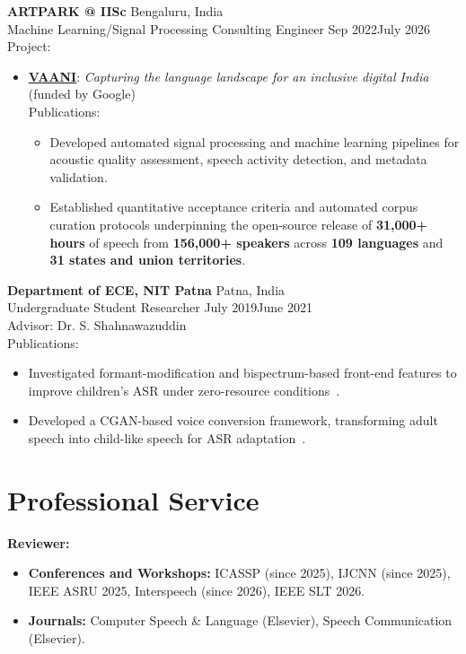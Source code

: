 \documentclass[letterpaper,11pt]{article}
\begin{document}
\textbf{ARTPARK @ IISc} \hfill Bengaluru, India\\
Machine Learning/Signal Processing Consulting Engineer \hfill Sep 2022\textendash July 2026 \\
Project: 
\begin{itemize}
\item \href{https://vaani.iisc.ac.in/}{\textbf{VAANI}}: \textit{Capturing the language landscape for an inclusive digital India} (funded by Google) \\
  Publications: \cite{pulikodan2026vaani}
\begin{itemize}
  \item Developed automated signal processing and machine learning pipelines for acoustic quality assessment, speech activity detection, and metadata validation.
  \item Established quantitative acceptance criteria and automated corpus curation protocols underpinning the open-source release of \textbf{31{,}000+ hours} of speech from \textbf{156{,}000+ speakers} across \textbf{109 languages} and \textbf{31 states and union territories}.
\end{itemize}
\end{itemize}

\textbf{Department of ECE, NIT Patna} \hfill Patna, India\\
Undergraduate Student Researcher \hfill July 2019\textendash June 2021 \\
Advisor: Dr. S. Shahnawazuddin \\
Publications: ~\cite{Syed2021_APAC, Syed2021_DSP}
\begin{itemize}
  \item Investigated formant-modification and bispectrum-based front-end features to improve children’s ASR under zero-resource conditions~\cite{Syed2021_APAC}.
  \item Developed a CGAN-based voice conversion framework, transforming adult speech into child-like speech for ASR adaptation~\cite{Syed2021_DSP}.
\end{itemize}

\section{Professional Service}

\textbf{Reviewer:}
\begin{itemize}
    \item \textbf{Conferences and Workshops:} ICASSP (since 2025), IJCNN (since 2025), IEEE ASRU 2025, Interspeech (since 2026), IEEE SLT 2026.
    \item \textbf{Journals:} Computer Speech \& Language (Elsevier), Speech Communication (Elsevier).
\end{itemize}
\end{document}

